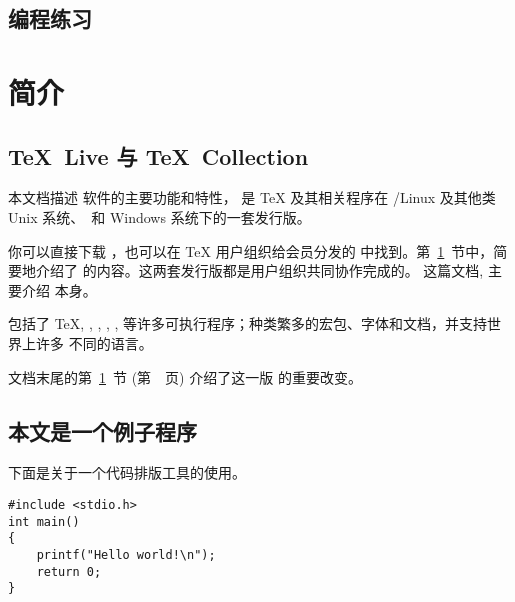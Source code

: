 \documentclass{article}
\begin{document}
\subsection{编程练习}
















































\section{简介}
\label{sec:intro}

\subsection{\TeX\ Live 与 \TeX\ Collection}

本文档描述 \TL{} 软件的主要功能和特性，\TL{} 是 \TeX{} 及其相关程序在
/Linux 及其他类 Unix 系统、\MacOSX\ 和 Windows
系统下的一套发行版。

你可以直接下载 \TL{}，也可以在 \TeX{} 用户组织给会员分发的 \TK{}
\DVD 中找到。第~\ref{sec:intro}~节中，简要地介绍了
\DVD 的内容。这两套发行版都是用户组织共同协作完成的。
这篇文档, 主要介绍 \TL{} 本身。

\TL{} 包括了 \TeX{}, \LaTeXe{}, \ConTeXt, \MF, \MP, \BibTeX{}
等许多可执行程序；种类繁多的宏包、字体和文档，并支持世界上许多
不同的语言。

文档末尾的第~\ref{sec:intro}~节 (第~\pageref{sec:intro}~页)
介绍了这一版 \TL{} 的重要改变。

\subsection{本文是一个例子程序}
下面是关于一个代码排版工具的使用。

\begin{verbatim}
#include <stdio.h>
int main()
{
	printf("Hello world!\n");
	return 0;
}
\end{verbatim}
\end{document}

